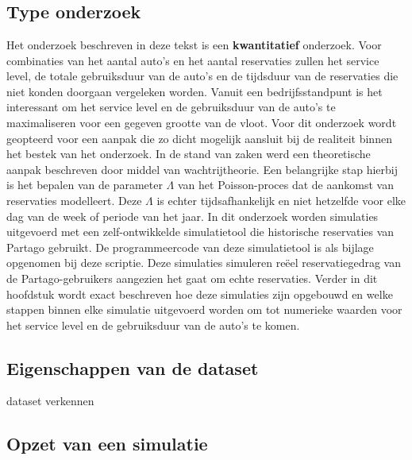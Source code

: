 
\chapter{}
\label{ch:methodologie}

\section{Type onderzoek}
Het onderzoek beschreven in deze tekst is een \textbf{kwantitatief} onderzoek. Voor combinaties van het aantal auto's en het aantal reservaties zullen het service level, de totale gebruiksduur van de auto's en de tijdsduur van de reservaties die niet konden doorgaan vergeleken worden. Vanuit een bedrijfsstandpunt is het interessant om het service level en de gebruiksduur van de auto's te maximaliseren voor een gegeven grootte van de vloot. Voor dit onderzoek wordt geopteerd voor een aanpak die zo dicht mogelijk aansluit bij de realiteit binnen het bestek van het onderzoek. In de stand van zaken werd een theoretische aanpak beschreven door middel van wachtrijtheorie. Een belangrijke stap hierbij is het bepalen van de parameter $\Lambda$ van het Poisson-proces dat de aankomst van reservaties modelleert. Deze $\Lambda$ is echter tijdsafhankelijk en niet hetzelfde voor elke dag van de week of periode van het jaar. In dit onderzoek worden simulaties uitgevoerd met een zelf-ontwikkelde simulatietool die historische reservaties van Partago gebruikt. De programmeercode van deze simulatietool is als bijlage opgenomen bij deze scriptie. Deze simulaties simuleren reëel reservatiegedrag van de Partago-gebruikers aangezien het gaat om echte reservaties. Verder in dit hoofdstuk wordt exact beschreven hoe deze simulaties zijn opgebouwd en welke stappen binnen elke simulatie uitgevoerd worden om tot numerieke waarden voor het service level en de gebruiksduur van de auto's te komen. 

\section{Eigenschappen van de dataset}
dataset verkennen

\section{Opzet van een simulatie}
